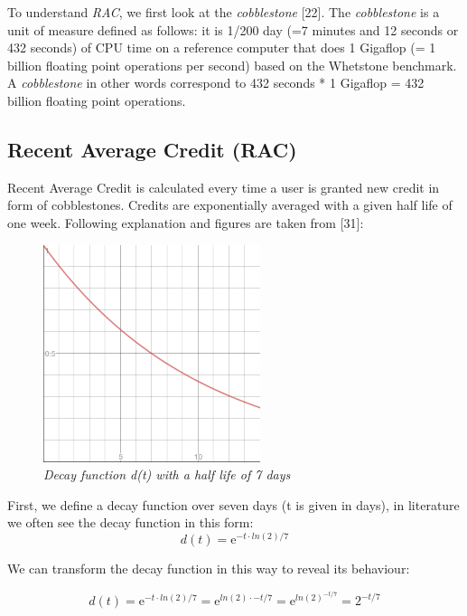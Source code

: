 To understand \textit{RAC}, we first look at the \textit{cobblestone} [22]. The \textit{cobblestone} is a unit of measure defined as follows: it is 1/200 day (=7 minutes and 12 seconds or 432 seconds) of CPU time on a reference computer that does 1 Gigaflop (= 1 billion floating point operations per second) based on the Whetstone benchmark. A \textit{cobblestone} in other words correspond to 432 seconds * 1 Gigaflop = 432 billion floating point operations.\\


\subsection{Recent Average Credit (RAC)}

Recent Average Credit is calculated every time a user is granted new credit in form of cobblestones. Credits are exponentially averaged with a given half life of one week. Following explanation and figures are taken from [31]:\\

\begin{figure}
\centering
\includegraphics{figures/halflife}
\medskip
\caption{\textit{Decay function d(t) with a half life of 7 days }}
\small
\end{figure}


First, we define a decay function over seven days (t is given in days), in literature we often see the decay function in this form:\\

\begin{equation}
d(t) =  \mathrm{e}^{-t \cdot  ln(2) / 7}  
\end{equation}

We can transform the decay function in this way to reveal its behaviour:

\begin{equation}
d(t) =  \mathrm{e}^{-t \cdot  ln(2) / 7} = \mathrm{e}^{ln(2) \cdot  -t/7} = \mathrm{e}^{ln(2)^{-t/7}} = 2^{-t/7}
\end{equation}

